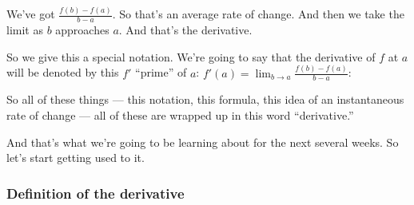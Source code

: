 \documentclass[pdftex, brazil, 12pt, twoside]{article}
\begin{document}
We've got $\displaystyle \frac{f(b) - f(a)}{b - a}$.
So that's an average rate of change.
And then we take the limit as $b$ approaches $a$.
And that's the derivative.

So we give this a special notation.
We're going to say that the derivative of $f$ at $a$
will be denoted by this $f'$ ``prime'' of $a$:
$\displaystyle f'(a) = \lim_{b \to a}\frac{f(b)-f(a)}{b-a}$:

\begin{figure}[H]
  \begin{center}
  \end{center}
\end{figure}

So all of these things --- this notation,
this formula, this idea of an instantaneous rate of change ---
all of these are wrapped up in this word ``derivative.''

And that's what we're going to be
learning about for the next several weeks.
So let's start getting used to it.

\begin{figure}[H]
  \begin{center}
    \label{fig:derivative-at-point}
  \end{center}
\end{figure}

\subsubsection{Definition of the derivative}
\label{u1-what-definition-of-derivative}
\end{document}
